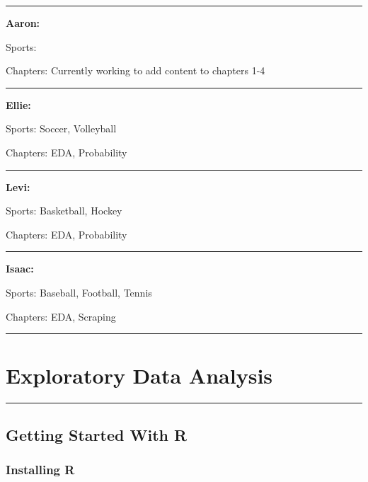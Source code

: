 \documentclass[
]{book}
\theoremstyle{definition}
\theoremstyle{definition}
\theoremstyle{definition}
\theoremstyle{definition}
\theoremstyle{remark}
\begin{document}
\begin{center}\rule{0.5\linewidth}{0.5pt}\end{center}

\textbf{Aaron:}

Sports:

Chapters: Currently working to add content to chapters 1-4

\begin{center}\rule{0.5\linewidth}{0.5pt}\end{center}

\textbf{Ellie:}

Sports: Soccer, Volleyball

Chapters: EDA, Probability

\begin{center}\rule{0.5\linewidth}{0.5pt}\end{center}

\textbf{Levi:}

Sports: Basketball, Hockey

Chapters: EDA, Probability

\begin{center}\rule{0.5\linewidth}{0.5pt}\end{center}

\textbf{Isaac:}

Sports: Baseball, Football, Tennis

Chapters: EDA, Scraping

\begin{center}\rule{0.5\linewidth}{0.5pt}\end{center}

\hypertarget{exploratory-data-analysis}{%
\chapter{Exploratory Data Analysis}\label{exploratory-data-analysis}}

\begin{center}\rule{0.5\linewidth}{0.5pt}\end{center}

\hypertarget{getting-started-with-r}{%
\section{Getting Started With R}\label{getting-started-with-r}}

\hypertarget{installing-r}{%
\subsection{Installing R}\label{installing-r}}
\end{document}
